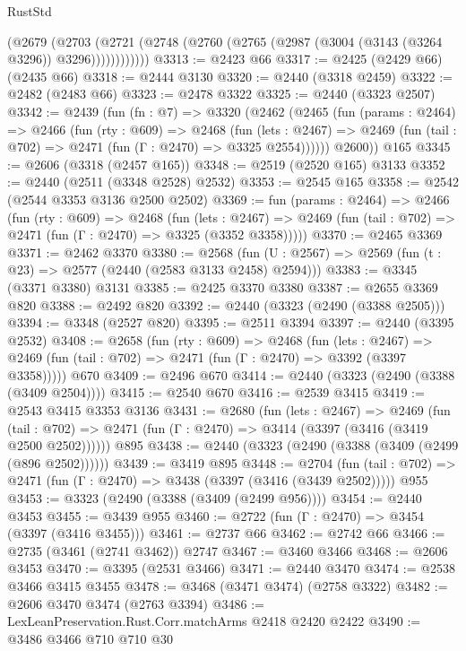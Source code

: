 \begin{lexlean}{RustStd}
\begin{coremodule}
            (@2679
              (@2703
                (@2721 (@2748 (@2760 (@2765 (@2987 (@3004 (@3143 (@3264 @3296)) @3296))))))))))))
@3313 := @2423 @66
@3317 := @2425 (@2429 @66) (@2435 @66)
@3318 := @2444 @3130
@3320 := @2440 (@3318 @2459)
@3322 := @2482 (@2483 @66)
@3323 := @2478 @3322
@3325 := @2440 (@3323 @2507)
@3342 := @2439
    (fun (fn : @7) =>
    @3320
      (@2462
        (@2465
          (fun (params : @2464) =>
          @2466
            (fun (rty : @609) =>
            @2468
              (fun (lets : @2467) =>
              @2469 (fun (tail : @702) => @2471 (fun (Γ : @2470) => @3325 @2554))))))
        @2600))
    @165
@3345 := @2606 (@3318 (@2457 @165))
@3348 := @2519 (@2520 @165) @3133
@3352 := @2440 (@2511 (@3348 @2528) @2532)
@3353 := @2545 @165
@3358 := @2542 (@2544 @3353 @3136 @2500 @2502)
@3369 := fun (params : @2464) =>
  @2466
    (fun (rty : @609) =>
    @2468
      (fun (lets : @2467) =>
      @2469 (fun (tail : @702) => @2471 (fun (Γ : @2470) => @3325 (@3352 @3358)))))
@3370 := @2465 @3369
@3371 := @2462 @3370
@3380 := @2568 (fun (U : @2567) => @2569 (fun (t : @23) => @2577 (@2440 (@2583 @3133 @2458) @2594)))
@3383 := @3345 (@3371 @3380) @3131
@3385 := @2425 @3370 @3380
@3387 := @2655 @3369 @820
@3388 := @2492 @820
@3392 := @2440 (@3323 (@2490 (@3388 @2505)))
@3394 := @3348 (@2527 @820)
@3395 := @2511 @3394
@3397 := @2440 (@3395 @2532)
@3408 := @2658
    (fun (rty : @609) =>
    @2468
      (fun (lets : @2467) =>
      @2469 (fun (tail : @702) => @2471 (fun (Γ : @2470) => @3392 (@3397 @3358)))))
    @670
@3409 := @2496 @670
@3414 := @2440 (@3323 (@2490 (@3388 (@3409 @2504))))
@3415 := @2540 @670
@3416 := @2539 @3415
@3419 := @2543 @3415 @3353 @3136
@3431 := @2680
    (fun (lets : @2467) =>
    @2469
      (fun (tail : @702) => @2471 (fun (Γ : @2470) => @3414 (@3397 (@3416 (@3419 @2500 @2502))))))
    @895
@3438 := @2440 (@3323 (@2490 (@3388 (@3409 (@2499 (@896 @2502))))))
@3439 := @3419 @895
@3448 := @2704
    (fun (tail : @702) => @2471 (fun (Γ : @2470) => @3438 (@3397 (@3416 (@3439 @2502)))))
    @955
@3453 := @3323 (@2490 (@3388 (@3409 (@2499 @956))))
@3454 := @2440 @3453
@3455 := @3439 @955
@3460 := @2722 (fun (Γ : @2470) => @3454 (@3397 (@3416 @3455)))
@3461 := @2737 @66
@3462 := @2742 @66
@3466 := @2735 (@3461 (@2741 @3462)) @2747
@3467 := @3460 @3466
@3468 := @2606 @3453
@3470 := @3395 (@2531 @3466)
@3471 := @2440 @3470
@3474 := @2538 @3466 @3415 @3455
@3478 := @3468 (@3471 @3474) (@2758 @3322)
@3482 := @2606 @3470 @3474 (@2763 @3394)
@3486 := LexLeanPreservation.Rust.Corr.matchArms @2418 @2420 @2422
@3490 := @3486 @3466 @710 @710 @30

\end{coremodule}
\end{lexlean}
